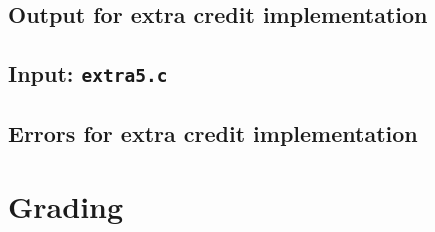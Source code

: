 \documentclass{article}
\begin{document}
\subsection{Output for extra credit implementation}



\subsection{Input: {\tt extra5.c}}



\subsection{Errors for extra credit implementation}





\section{Grading}
\end{document}
